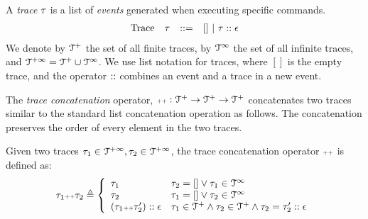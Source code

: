 A \emph{trace}
 $\mathtt{\tau}$ is a list of \emph{events} generated when executing specific commands. 
 \[
 \begin{array}{llll}
 \mbox{Trace} & \mathtt{\tau}
 & ::= & [] ~|~ \mathtt{\tau} :: \mathtt{\epsilon}
 \end{array}
 \]
 We denote by $\mathcal{T}^{+}$ the set of all finite traces, by $\mathcal{T}^{\infty} $ the set of all infinite traces, and $\mathcal{T}^{+\infty} = \mathcal{T}^{+} \cup \mathcal{T}^{\infty}$. 
 We use list notation for traces, where $[]$ is the empty trace, and the operator ${\small ::}$ combines an event and a trace in a new event. 

The \emph{trace concatenation} operator, ${\scriptscriptstyle ++}: \mathcal{T}^{+} \to \mathcal{T}^{+} \to \mathcal{T}^{+}$ concatenates two traces
similar to the standard list concatenation operation as follows.
The concatenation preserves the order of every element in the two traces.

 \begin{defn}
 \label{def:trace_cat}
 Given two traces $\mathtt{\tau}_1 \in \mathcal{T}^{+\infty}, \mathtt{\tau}_2 \in \mathcal{T}^{+\infty}$, the trace concatenation operator 
 ${\scriptscriptstyle ++}$ is defined as:
 \[
 \trace_1 \tracecat \trace_2 \triangleq
 \left\{
 \begin{array}{ll} 
 \trace_1 & \trace_2 = [] \lor \trace_1 \in \inftdom \\
 \trace_2 & \trace_1 = [] \lor \trace_2 \in \inftdom \\
 (\trace_1 \tracecat \trace_2'):: \event & \trace_1 \in \ftdom \land \trace_2 \in \ftdom \land \trace_2 = \trace_2' :: \event
 \end{array}
 \right.
 \]
 \end{defn}